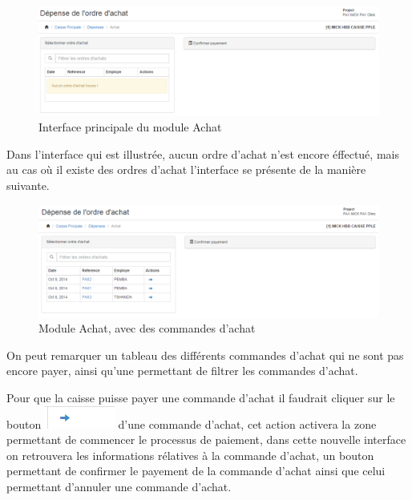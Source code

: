 \documentclass[12pt,a4paper]{report}
\begin{document}
\begin{figure}[h]
\begin{center}
\includegraphics[width=14cm]{pic/Achat.png}
\end{center}
\caption{Interface principale du module Achat}
\label{Interface principale du module Achat}
\end{figure}

Dans l'interface qui est illustrée, aucun ordre d'achat n'est encore éffectué, mais au cas où il existe des ordres d'achat l'interface se présente de la manière suivante.

\begin{figure}[h]
\begin{center}
\includegraphics[width=14cm]{pic/Achat2.png}
\end{center}
\caption{Module Achat, avec des commandes d'achat}
\label{Module Achat, avec des commandes d'achat}
\end{figure}

On peut remarquer un tableau des différents commandes d'achat qui ne sont pas encore payer, ainsi qu'une permettant de filtrer les commandes d'achat. 

\newpage
Pour que la caisse puisse payer une commande d'achat il faudrait cliquer sur le bouton \includegraphics[scale=0.7]{pic/SelectedPOrder.png} d'une commande d'achat, cet action activera la zone permettant de commencer le processus de paiement, dans cette nouvelle interface on retrouvera les informations rélatives à la commande d'achat, un bouton permettant de confirmer le payement de la commande d'achat ainsi que celui permettant d'annuler une commande d'achat.
\end{document}
